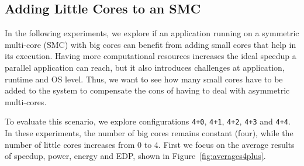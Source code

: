 

\subsection{Adding Little Cores to an SMC}

In the following experiments, we explore if an application running on a symmetric multi-core (SMC) with 
big cores can benefit from adding small cores that help in its execution. Having more computational 
resources increases the ideal speedup a parallel application can reach, but it also introduces 
challenges at application, runtime and OS level. Thus, we want to see how many small cores have to 
be added to the system to compensate the cons of having to deal with asymmetric multi-cores.

To evaluate this scenario, we explore configurations \texttt{4+0}, \texttt{4+1}, \texttt{4+2}, \texttt{4+3} and \texttt{4+4}. In these experiments, the number of big cores remains constant (four), while the number of little cores increases from 0 to 4. First we focus on the average results of speedup, power, energy and EDP, shown in Figure~\ref{fig:averages4plus}.

